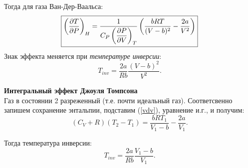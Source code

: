 Тогда для газа Ван-Дер-Ваальса:
\begin{equation}
\boxed{
    \left(\dfrac{\partial {T}}{\partial {P}} \right)_{H} = \frac{1}{C_P \left(\dfrac{\partial {P}}{\partial {V}} \right)_{T}} \left(
    \frac{b R T}{(V - b)^2} - \frac{2a}{V^2}
    \right)
    }
\end{equation}
Знак эффекта меняется при \textit{температуре инверсии}:
\begin{equation}
    T_{inv} = \frac{2a}{Rb} \frac{(V-b)^2}{V^2}.
\end{equation}

\phantom{42}

\noindent
\textbf{Интегральный эффект Джоуля Томпсона} \\
Газ в состоянии 2 разреженный (т.е. почти идеальный газ). Соответсвенно запишем сохранение энтальпии, подставим (\ref{vdv}), уравнение и.г., и получим:
\begin{equation}
    (C_V + R) (T_2 - T_1) = \frac{bRT_1}{V_1-b} - \frac{2a}{V_1}.
\end{equation}

Тогда температура инверсии:
\begin{equation}
    T_{inv} = \frac{2a}{Rb} \frac{V_1-b}{V_1}.
\end{equation}
